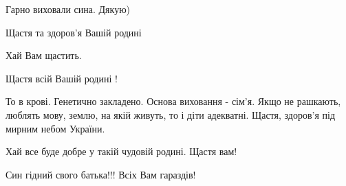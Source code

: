 \begin{itemize}
Гарно виховали сина. Дякую)

 
Щастя та здоров'я Вашій родині

 
Хай Вам щастить.

 
Щастя всій Вашій родині !

 
То в крові. Генетично закладено.
Основа виховання - сім'я.
Якщо не рашкають, люблять мову, землю, на якій живуть, то і діти адекватні.
Щастя, здоров'я під мирним небом України.


 
Хай все буде добре у такій чудовій родині. Щастя вам!


 
Син гідний свого батька!!! Всіх Вам гараздів!

 

\end{itemize}
